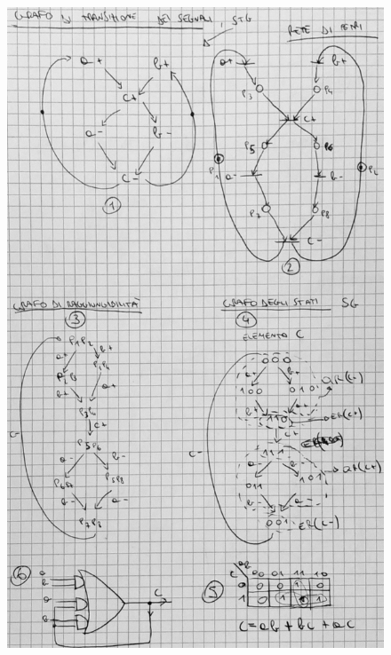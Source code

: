 \documentclass[a4paper, notitlepage, 10pt]{report}
\begin{document}
\begin{multicols}{2}
\begin{figure}[H]
		\includegraphics[scale=0.22]{macchinestati}
	\end{figure}
\end{multicols}
\end{document}
